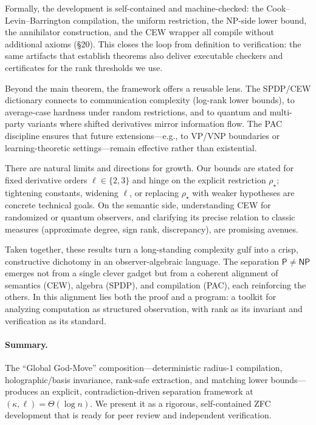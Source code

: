 \documentclass[12pt]{article}
\theoremstyle{definition}
\theoremstyle{definition}
\theoremstyle{remark}
\theoremstyle{remark}
\begin{document}
Formally, the development is self-contained and machine-checked: the Cook--Levin--Barrington compilation, the uniform restriction, the NP-side lower bound, the annihilator construction, and the CEW wrapper all compile without additional axioms (\S20). This closes the loop from definition to verification: the same artifacts that establish theorems also deliver executable checkers and certificates for the rank thresholds we use.

Beyond the main theorem, the framework offers a reusable lens. The SPDP/CEW dictionary connects to communication complexity (log-rank lower bounds), to average-case hardness under random restrictions, and to quantum and multi-party variants where shifted derivatives mirror information flow. The PAC discipline ensures that future extensions---e.g., to VP/VNP boundaries or learning-theoretic settings---remain effective rather than existential.

There are natural limits and directions for growth. Our bounds are stated for fixed derivative orders $\ell \in \{2,3\}$ and hinge on the explicit restriction $\rho_\star$; tightening constants, widening $\ell$, or replacing $\rho_\star$ with weaker hypotheses are concrete technical goals. On the semantic side, understanding CEW for randomized or quantum observers, and clarifying its precise relation to classic measures (approximate degree, sign rank, discrepancy), are promising avenues.

Taken together, these results turn a long-standing complexity gulf into a crisp, constructive dichotomy in an observer-algebraic language. The separation $\mathsf{P} \neq \mathsf{NP}$ emerges not from a single clever gadget but from a coherent alignment of semantics (CEW), algebra (SPDP), and compilation (PAC), each reinforcing the others. In this alignment lies both the proof and a program: a toolkit for analyzing computation as structured observation, with rank as its invariant and verification as its standard.

\paragraph{Summary.}
The ``Global God-Move'' composition---deterministic radius-$1$ compilation, holographic/basis invariance, rank-safe extraction, and matching lower bounds---produces an explicit, contradiction-driven separation framework at $(\kappa,\ell)=\Theta(\log n)$. We present it as a rigorous, self-contained ZFC development that is ready for peer review and independent verification.
\end{document}
